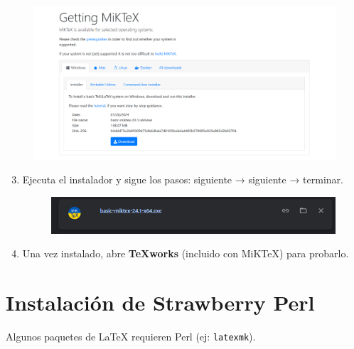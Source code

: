 \documentclass{article}
\begin{document}
\begin{figure}[h!]
    \centering
    \includegraphics[width=\textwidth, height=0.5\textheight, keepaspectratio]{mike.png}
\end{figure}

\begin{enumerate}
    \setcounter{enumi}{2} %
    \item Ejecuta el instalador y sigue los pasos: siguiente → siguiente → terminar.
    
    \begin{figure}[h!]
        \centering
        \includegraphics[width=\textwidth, height=0.5\textheight, keepaspectratio]{instalador mike.png}
    \end{figure}

    \item Una vez instalado, abre \textbf{TeXworks} (incluido con MiKTeX) para probarlo.
\end{enumerate}


\section{Instalación de Strawberry Perl}
Algunos paquetes de LaTeX requieren Perl (ej: \texttt{latexmk}).  
\end{document}
